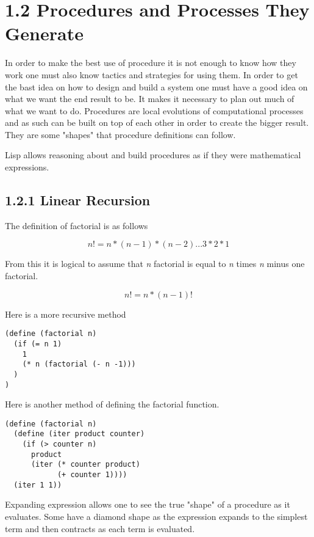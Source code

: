 \documentclass[11pt]{article}
\begin{document}
\section{1.2 Procedures and Processes They Generate}
\label{sec:orgb0aad1b}
In order to make the best use of procedure it is not enough to know how
they work one must also know tactics and strategies for using them. In
order to get the bast idea on how to design and build a system one must
have a good idea on what we want the end result to be. It makes it
necessary to plan out much of what we want to do. Procedures are local
evolutions of computational processes and as such can be built on top of
each other in order to create the bigger result. They are some "shapes"
that procedure definitions can follow.

Lisp allows reasoning about and build procedures as if they were
mathematical expressions.

\subsection{1.2.1 Linear Recursion}
\label{sec:orge403bc2}
The definition of factorial is as follows

\begin{equation}
n! = n * (n - 1) * (n -2) ...3 * 2 * 1
\end{equation}

From this it is logical to assume that \emph{n} factorial is equal to \emph{n}
times \emph{n} minus one factorial.

\begin{equation}
n! = n * (n-1)!
\end{equation}

Here is a more recursive method

\begin{verbatim}
(define (factorial n)
  (if (= n 1)
    1
    (* n (factorial (- n -1)))
  )
)
\end{verbatim}

Here is another method of defining the factorial function.

\begin{verbatim}
(define (factorial n)
  (define (iter product counter)
    (if (> counter n)
      product
      (iter (* counter product)
            (+ counter 1))))
  (iter 1 1))
\end{verbatim}

Expanding expression allows one to see the true "shape" of a procedure
as it evaluates. Some have a diamond shape as the expression expands to
the simplest term and then contracts as each term is evaluated.
\end{document}
